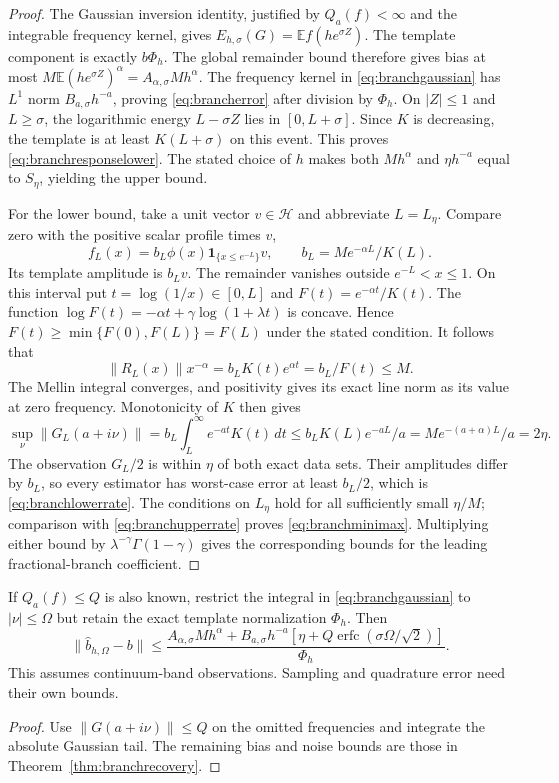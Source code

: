 \begin{proof}
The Gaussian inversion identity, justified by $Q_a(f)<\infty$ and the
integrable frequency kernel, gives
$E_{h,\sigma}(G)=\mathbb E f(he^{\sigma Z})$.
The template component is exactly $b\Phi_h$. The global remainder bound
therefore gives bias at most
$M\mathbb E(he^{\sigma Z})^\alpha=A_{\alpha,\sigma}Mh^\alpha$.
The frequency kernel in \eqref{eq:branchgaussian} has $L^1$ norm
$B_{a,\sigma}h^{-a}$, proving \eqref{eq:brancherror} after division by
$\Phi_h$. On $|Z|\le1$ and $L\ge\sigma$, the logarithmic energy
$L-\sigma Z$ lies in $[0,L+\sigma]$. Since $K$ is decreasing, the template
is at least $K(L+\sigma)$ on this event. This proves
\eqref{eq:branchresponselower}. The stated choice of $h$ makes both
$Mh^\alpha$ and $\eta h^{-a}$ equal to $S_\eta$, yielding the upper bound.

For the lower bound, take a unit vector $v\in\mathcal H$ and abbreviate
$L=L_\eta$. Compare zero with the positive scalar profile times $v$,
\[
 f_L(x)=b_L\phi(x)\mathbf1_{\{x\le e^{-L}\}}v,
 \qquad b_L=M e^{-\alpha L}/K(L).
\]
Its template amplitude is $b_Lv$. The remainder vanishes outside
$e^{-L}<x\le1$. On this interval put $t=\log(1/x)\in[0,L]$ and
$F(t)=e^{-\alpha t}/K(t)$. The function
$\log F(t)=-\alpha t+\gamma\log(1+\lambda t)$ is concave. Hence
$F(t)\ge\min\{F(0),F(L)\}=F(L)$ under the stated condition.
It follows that
\[
 \|R_L(x)\|x^{-\alpha}
 =b_LK(t)e^{\alpha t}=b_L/F(t)\le M.
\]
The Mellin integral converges, and positivity gives its exact line norm
as its value at zero frequency. Monotonicity of $K$ then gives
\[
 \sup_\nu\|G_L(a+i\nu)\|
 =b_L\int_L^\infty e^{-at}K(t)\,dt
 \le b_LK(L)e^{-aL}/a
 =M e^{-(a+\alpha)L}/a=2\eta.
\]
The observation $G_L/2$ is within $\eta$ of both exact data sets.
Their amplitudes differ by $b_L$, so every estimator has worst-case
error at least $b_L/2$, which is \eqref{eq:branchlowerrate}.
The conditions on $L_\eta$ hold for all sufficiently small $\eta/M$;
comparison with \eqref{eq:branchupperrate} proves \eqref{eq:branchminimax}.
Multiplying either bound by $\lambda^{-\gamma}\Gamma(1-\gamma)$ gives
the corresponding bounds for the leading fractional-branch coefficient.
\end{proof}

\begin{corollary}
\label{cor:branchband}
If $Q_a(f)\le Q$ is also known, restrict the integral in
\eqref{eq:branchgaussian} to $|\nu|\le\Omega$ but retain the exact
template normalization $\Phi_h$. Then
\[
 \|\widehat b_{h,\Omega}-b\|
 \le\frac{A_{\alpha,\sigma}Mh^\alpha+
 B_{a,\sigma}h^{-a}
 [\eta+Q\operatorname{erfc}(\sigma\Omega/\sqrt2)]}{\Phi_h}.
\]
This assumes continuum-band observations. Sampling and quadrature error
need their own bounds.
\end{corollary}
\begin{proof}
Use $\|G(a+i\nu)\|\le Q$ on the omitted frequencies and integrate the
absolute Gaussian tail. The remaining bias and noise bounds are those in
Theorem~\ref{thm:branchrecovery}.
\end{proof}

